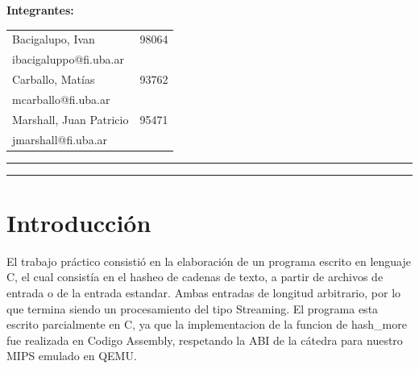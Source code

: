 \documentclass[11pt,a4paper]{article}
\newcommand\blankpage{%
	\null
	\thispagestyle{empty}%
	\addtocounter{page}{-1}%
	\newpage}
\begin{document}
\begin{titlepage}
	\begin{flushleft}
	\begin{table}[H]
		\begin{flushleft}
		\textbf{Integrantes:}\\
		\vspace{0.01\textheight}
		\begin{tabular}{l r}
			Bacigalupo, Ivan  & 98064\\
			\hspace{0.05\textheight}ibacigaluppo@fi.uba.ar&\\
			Carballo, Matías   & 93762\\
			\hspace{0.05\textheight}mcarballo@fi.uba.ar&\\
			Marshall, Juan Patricio & 95471\\
			\hspace{0.05\textheight}jmarshall@fi.uba.ar&\\
		\end{tabular}
		\end{flushleft}
	\end{table}
		

	\end{flushleft}
	\vspace{0.05\textheight}
	\vspace{2pt}
	\vfill
	\rule{\textwidth}{1pt}\par %
	\vspace{2pt}\vspace{-\baselineskip} %
	\rule{\textwidth}{0.4pt}\par %
	
\end{titlepage}

\blankpage

\tableofcontents

\newpage

\section{Introducción}
El trabajo práctico consistió en la elaboración de un programa escrito en lenguaje C, el cual consistía en el hasheo de cadenas de texto, a partir de archivos de entrada o de la entrada estandar. Ambas entradas de longitud arbitrario, por lo que termina siendo un procesamiento del tipo Streaming.
El programa esta escrito parcialmente en C, ya que la implementacion de la funcion de hash\_more fue realizada en Codigo Assembly, respetando la ABI de la cátedra para nuestro MIPS emulado en QEMU.
\end{document}
